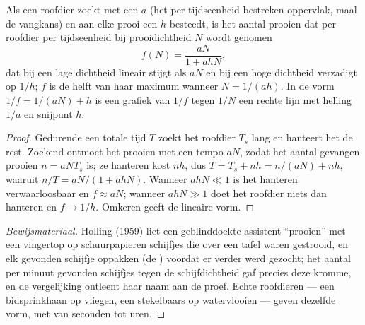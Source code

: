 \begin{theorem}[De schijfvergelijking]\label{thm:b1:species-interactions:holling}
Als een roofdier zoekt met een \emph{} $a$ (het per
tijdseenheid bestreken oppervlak, maal de vangkans) en aan elke prooi een
 $h$ besteedt, is het aantal prooien dat per roofdier per
tijdseenheid bij prooidichtheid $N$ wordt genomen
\[
f(N) = \frac{aN}{1 + ahN} ,
\]
dat bij een lage dichtheid lineair stijgt als $aN$ en bij een hoge dichtheid
verzadigt op $1/h$; $f$ is de helft van haar maximum wanneer $N = 1/(ah)$.
In de vorm $1/f = 1/(aN) + h$ is een grafiek van $1/f$ tegen $1/N$ een rechte
lijn met helling $1/a$ en snijpunt $h$.
\end{theorem}
\begin{proof}
Gedurende een totale tijd $T$ zoekt het roofdier $T_s$ lang en hanteert het
de rest. Zoekend ontmoet het prooien met een tempo $aN$, zodat het aantal
gevangen prooien $n = aN T_s$ is; ze hanteren kost $nh$, dus $T = T_s + nh =
n/(aN) + nh$, waaruit $n/T = aN/(1 + ahN)$. Wanneer $ahN \ll 1$ is het
hanteren verwaarloosbaar en $f \approx aN$; wanneer $ahN \gg 1$ doet het
roofdier niets dan hanteren en $f \to 1/h$. Omkeren geeft de lineaire vorm.
\end{proof}
\begin{proof}[Bewijsmateriaal]
Holling (1959) liet een geblinddoekte assistent ``prooien'' met een
vingertop op schuurpapieren schijfjes die over een tafel waren gestrooid, en
elk gevonden schijfje oppakken (de ) voordat er verder werd
gezocht; het aantal per minuut gevonden schijfjes tegen de schijfdichtheid
gaf precies deze kromme, en de vergelijking ontleent haar naam aan de proef.
Echte roofdieren --- een bidsprinkhaan op vliegen, een stekelbaars op
watervlooien --- geven dezelfde vorm, met  van seconden tot uren.
\end{proof}

